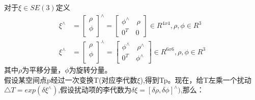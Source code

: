 对于$\xi\in SE(3)$定义\\
\begin{align}
	\xi^\wedge &=
	\left[ \begin{array}{c}   %
	\rho \\  %
	\phi \\  %
	\end{array}	\right] ^ \wedge = 
	\left[ \begin{array}{cc}
	   \phi^\wedge \quad  \rho \\
	    0^T        \quad  0
	\end{array} \right] \in R^{4x4},\rho,\phi\in R^3 \\	
	\xi^\curlywedge &=
	\left[ \begin{array}{c}   %
      	\rho \\  %
    	\phi \\  %
	\end{array}	\right] ^ \curlywedge = 
	\left[ \begin{array}{cc}
    	\phi^\wedge \quad  \rho^\wedge \\
    	0^T         \quad  \phi^\wedge
	\end{array} \right] \in R^{6x6},\rho,\phi\in R^3
\end{align}
其中$\rho$为平移分量，$\phi$为旋转分量。\\
\indent 假设某空间点p经过一次变换T(对应李代数$\xi$),得到Tp。现在，给T左乘一个扰动$ \bigtriangleup T = exp(\delta\xi ^ \wedge)$,假设扰动项的李代数为$\delta\xi=[\delta\rho,\delta\phi] ^ \wedge )$,那么：\\


